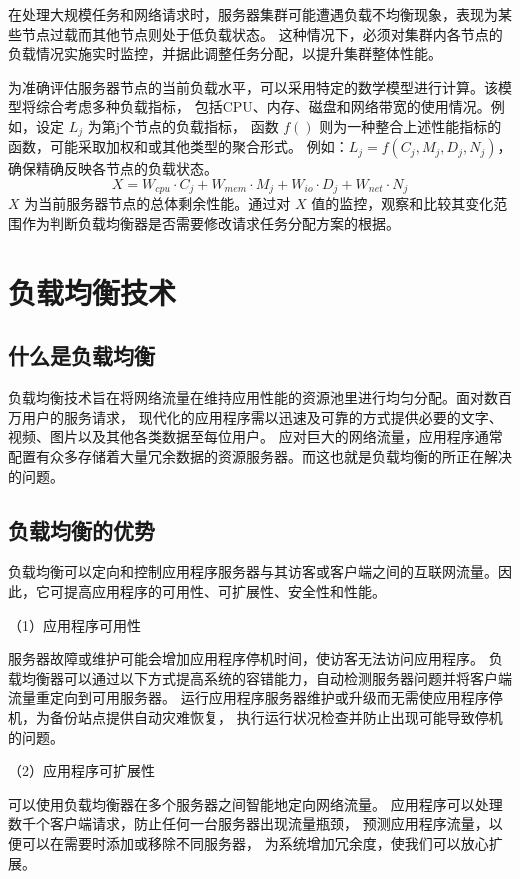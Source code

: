 在处理大规模任务和网络请求时，服务器集群可能遭遇负载不均衡现象，表现为某些节点过载而其他节点则处于低负载状态。
这种情况下，必须对集群内各节点的负载情况实施实时监控，并据此调整任务分配，以提升集群整体性能。

为准确评估服务器节点的当前负载水平，可以采用特定的数学模型进行计算。该模型将综合考虑多种负载指标，
包括CPU、内存、磁盘和网络带宽的使用情况。例如，设定 $L_{j}$ 为第j个节点的负载指标，
函数 $f()$ 则为一种整合上述性能指标的函数，可能采取加权和或其他类型的聚合形式。
例如：$L_{j} = f(C_{j}, M_{j}, D_{j}, N_{j})$，确保精确反映各节点的负载状态。
\[
	X = W_{cpu} \cdot C_j + W_{mem} \cdot M_j + W_{io} \cdot D_j + W_{net} \cdot N_j\tag{1.1}
\]
$X$ 为当前服务器节点的总体剩余性能。通过对 $X$ 值的监控，观察和比较其变化范围作为判断负载均衡器是否需要修改请求任务分配方案的根据。

\section{负载均衡技术}

\subsection{什么是负载均衡}

负载均衡技术旨在将网络流量在维持应用性能的资源池里进行均匀分配。面对数百万用户的服务请求，
现代化的应用程序需以迅速及可靠的方式提供必要的文字、视频、图片以及其他各类数据至每位用户。
应对巨大的网络流量，应用程序通常配置有众多存储着大量冗余数据的资源服务器。而这也就是负载均衡的所正在解决的问题。

\subsection{负载均衡的优势}

负载均衡可以定向和控制应用程序服务器与其访客或客户端之间的互联网流量。因此，它可提高应用程序的可用性、可扩展性、安全性和性能。

（1）应用程序可用性

服务器故障或维护可能会增加应用程序停机时间，使访客无法访问应用程序。
负载均衡器可以通过以下方式提高系统的容错能力，自动检测服务器问题并将客户端流量重定向到可用服务器。
运行应用程序服务器维护或升级而无需使应用程序停机，为备份站点提供自动灾难恢复，
执行运行状况检查并防止出现可能导致停机的问题。

（2）应用程序可扩展性

可以使用负载均衡器在多个服务器之间智能地定向网络流量。
应用程序可以处理数千个客户端请求，防止任何一台服务器出现流量瓶颈，
预测应用程序流量，以便可以在需要时添加或移除不同服务器，
为系统增加冗余度，使我们可以放心扩展。

